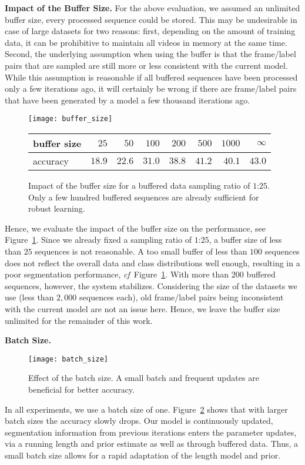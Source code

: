 \documentclass[10pt,twocolumn,letterpaper]{article}
\def\cf{\emph{cf}\onedot} \def\Cf{\emph{Cf}\onedot}
\begin{document}
\textbf{Impact of the Buffer Size.}
For the above evaluation, we assumed an unlimited buffer size, \ie every processed sequence
could be stored. This may be undesirable in case of large datasets for two reasons:
first, depending on the amount of training data, it can be prohibitive to maintain all videos
in memory at the same time. Second, the underlying assumption when using the buffer is that
the frame/label pairs that are sampled are still more or less consistent with the current
model. While this assumption is reasonable if all buffered sequences have been processed
only a few iterations ago, it will certainly be wrong if there are frame/label pairs that
have been generated by a model a few thousand iterations ago. 
\begin{figure}[tb]
    \centering
    \texttt{[image: buffer\_size]}
    \footnotesize
    \begin{tabularx}{0.48\textwidth}{Xr@{\hskip 1.7ex}r@{\hskip 1.7ex}r@{\hskip 1.7ex}r@{\hskip 1.7ex}r@{\hskip 1.7ex}r@{\hskip 1.7ex}r}
        \toprule
            buffer size      & $ 25 $   & $ 50 $   & $ 100 $  & $ 200 $  & $ 500 $  & $ 1000 $ & $ \infty $ \\
        \midrule
            accuracy         & $ 18.9 $ & $ 22.6 $ & $ 31.0 $ & $ 38.8 $ & $ 41.2 $ & $ 40.1 $ & $ 43.0 $   \\
        \bottomrule
    \end{tabularx}
    \caption{Impact of the buffer size for a buffered data sampling ratio of $1$:$25$. Only a few hundred buffered
             sequences are already sufficient for robust learning.}
    \label{fig:bufferSize}
\end{figure}
Hence, we evaluate the impact of the buffer size on the performance, see Figure~\ref{fig:bufferSize}.
Since we already fixed a sampling ratio of $1$:$25$, a buffer size of less than $ 25 $ sequences
is not reasonable. A too small buffer of less than $ 100 $ sequences does
not reflect the overall data and class distributions well enough, resulting in a poor segmentation
performance, \cf~Figure~\ref{fig:bufferSize}.
With more than $ 200 $ buffered sequences, however, the system stabilizes.
Considering the size of the datasets we use (less than $ 2,000 $ sequences each), old frame/label
pairs being inconsistent with the current model are not an issue here. Hence, we leave the buffer size unlimited for the remainder of this work.

\textbf{Batch Size.}
\begin{figure}[tb]
    \centering
    \texttt{[image: batch\_size]}
    \caption{Effect of the batch size. A small batch and frequent updates are beneficial for better accuracy.}
    \label{fig:batchSize}
\end{figure}
In all experiments, we use a batch size of one. Figure~\ref{fig:batchSize} shows that with larger batch
sizes the accuracy slowly drops. Our model is continuously updated, \ie segmentation information from
previous iterations enters the parameter updates, via a running length and prior estimate as well as through
buffered data. Thus, a small batch size allows for a rapid adaptation of the length model and prior.
\end{document}
